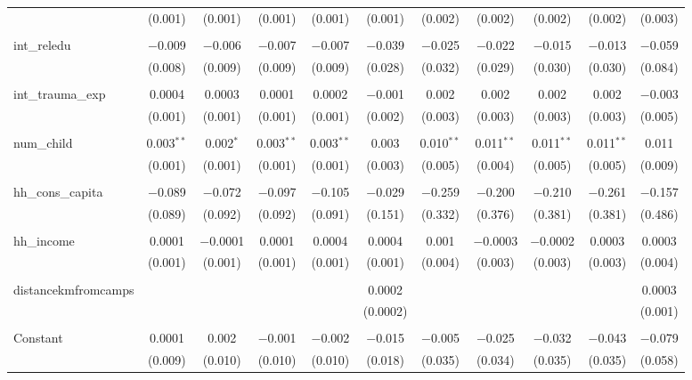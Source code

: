 \begin{table}[H]
\begin{tabular}{@{\extracolsep{4pt}}lcccccccccc}
  & (0.001) & (0.001) & (0.001) & (0.001) & (0.001) & (0.002) & (0.002) & (0.002) & (0.002) & (0.003) \\ 
  & & & & & & & & & & \\ 
 int\_reledu & $-$0.009 & $-$0.006 & $-$0.007 & $-$0.007 & $-$0.039 & $-$0.025 & $-$0.022 & $-$0.015 & $-$0.013 & $-$0.059 \\ 
  & (0.008) & (0.009) & (0.009) & (0.009) & (0.028) & (0.032) & (0.029) & (0.030) & (0.030) & (0.084) \\ 
  & & & & & & & & & & \\ 
 int\_trauma\_exp & 0.0004 & 0.0003 & 0.0001 & 0.0002 & $-$0.001 & 0.002 & 0.002 & 0.002 & 0.002 & $-$0.003 \\ 
  & (0.001) & (0.001) & (0.001) & (0.001) & (0.002) & (0.003) & (0.003) & (0.003) & (0.003) & (0.005) \\ 
  & & & & & & & & & & \\ 
 num\_child & 0.003$^{**}$ & 0.002$^{*}$ & 0.003$^{**}$ & 0.003$^{**}$ & 0.003 & 0.010$^{**}$ & 0.011$^{**}$ & 0.011$^{**}$ & 0.011$^{**}$ & 0.011 \\ 
  & (0.001) & (0.001) & (0.001) & (0.001) & (0.003) & (0.005) & (0.004) & (0.005) & (0.005) & (0.009) \\ 
  & & & & & & & & & & \\ 
 hh\_cons\_capita & $-$0.089 & $-$0.072 & $-$0.097 & $-$0.105 & $-$0.029 & $-$0.259 & $-$0.200 & $-$0.210 & $-$0.261 & $-$0.157 \\ 
  & (0.089) & (0.092) & (0.092) & (0.091) & (0.151) & (0.332) & (0.376) & (0.381) & (0.381) & (0.486) \\ 
  & & & & & & & & & & \\ 
 hh\_income & 0.0001 & $-$0.0001 & 0.0001 & 0.0004 & 0.0004 & 0.001 & $-$0.0003 & $-$0.0002 & 0.0003 & 0.0003 \\ 
  & (0.001) & (0.001) & (0.001) & (0.001) & (0.001) & (0.004) & (0.003) & (0.003) & (0.003) & (0.004) \\ 
  & & & & & & & & & & \\ 
 distancekmfromcamps &  &  &  &  & 0.0002 &  &  &  &  & 0.0003 \\ 
  &  &  &  &  & (0.0002) &  &  &  &  & (0.001) \\ 
  & & & & & & & & & & \\ 
 Constant & 0.0001 & 0.002 & $-$0.001 & $-$0.002 & $-$0.015 & $-$0.005 & $-$0.025 & $-$0.032 & $-$0.043 & $-$0.079 \\ 
  & (0.009) & (0.010) & (0.010) & (0.010) & (0.018) & (0.035) & (0.034) & (0.035) & (0.035) & (0.058) \\ 

\end{tabular}
\end{table}
